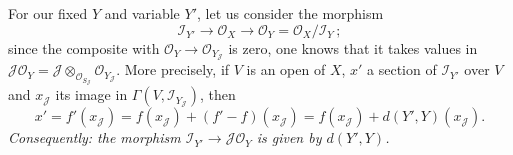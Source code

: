 For our fixed \(Y\) and variable \(Y'\), let us consider the morphism
\[
\mathcal{I}_{Y'}\longrightarrow\mathcal{O}_{X}\longrightarrow\mathcal{O}_{Y}=\mathcal{O}_{X}/\mathcal{I}_{Y}\,;
\]
since the composite with \(\mathcal{O}_{Y}\to\mathcal{O}_{Y_{\mathcal{J}}}\) is zero, one knows that it takes values in \(\mathcal{J}\mathcal{O}_{Y}=\mathcal{J}\otimes_{\mathcal{O}_{S_{\mathcal{J}}}}\mathcal{O}_{Y_{\mathcal{J}}}\). More precisely, if \(V\) is an open of \(X\), \(x'\) a section of \(\mathcal{I}_{Y'}\) over \(V\) and \(x_{\mathcal{J}}\) its image in \(\Gamma(V,\mathcal{I}_{Y_{\mathcal{J}}})\), then
\[
x'=f'(x_{\mathcal{J}})=f(x_{\mathcal{J}})+(f'-f)(x_{\mathcal{J}})=f(x_{\mathcal{J}})+d(Y',Y)(x_{\mathcal{J}}).
\]
\emph{Consequently: the morphism \(\mathcal{I}_{Y'}\to\mathcal{J}\mathcal{O}_{Y}\) is given by \(d(Y',Y)\).}

